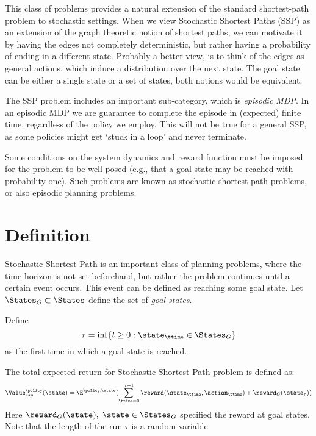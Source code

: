 




This class of problems provides a natural extension of the standard shortest-path problem to stochastic settings. When we view Stochastic Shortest Paths (SSP) as an extension of the graph theoretic notion of shortest paths, we can motivate it by having the edges not completely deterministic, but rather having a probability of ending in a different state.
%
Probably a better view, is to think of the edges as general actions, which induce a distribution over the next state.
%
The goal state can be either a single state or a set of states, both notions would be equivalent. 

The SSP problem includes an important sub-category, which is {\em episodic MDP}. In an episodic MDP we are guarantee to complete the episode in (expected) finite time, regardless of the policy we employ. This will not be true for a general SSP, as some policies might get `stuck in a loop' and never terminate.


Some conditions on the system dynamics and reward function must be imposed for the problem to be well posed (e.g., that a goal state may be reached  with probability one).
Such problems are known as stochastic shortest path problems, or also episodic planning problems. 

\section{Definition}

Stochastic Shortest Path is an important class of planning problems, 
where the time horizon is not
set beforehand, but rather the problem continues until a certain
event occurs. This event can be defined as reaching some goal state.
Let  ${\States_G} \subset \States$ define the set of \emph{goal
states}. 

Define
\[\tau  = \inf \{ t \ge 0:{\state_\ttime} \in {\States_G}\} \]
as the first time in which a goal state is reached. 

The total expected return for Stochastic Shortest Path problem is defined as:
\[\Value_{ssp}^\policy (\state) = {\E^{\policy ,\state}}(\sum\limits_{\ttime = 0}^{\tau  - 1} {\reward({\state_\ttime},{\action_\ttime})}  + {\reward_G}({\state_\tau }))\]
Here ${\reward_G}(\state),\;\state \in {\States_G}$ specified the
reward at goal states. Note that the length of the run $\tau$ is a random variable.

